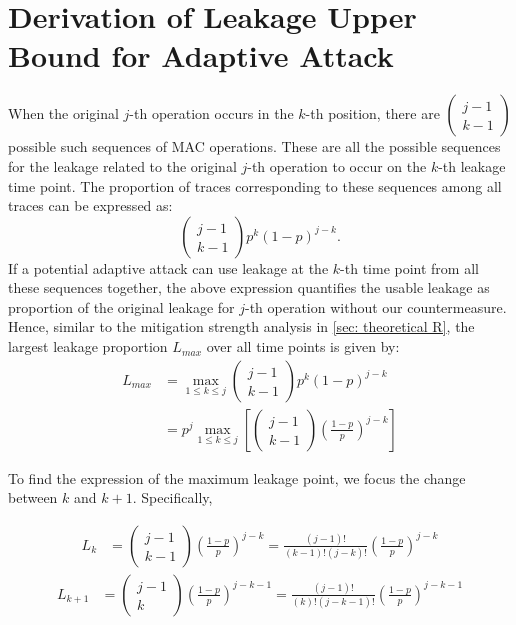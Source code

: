 \appendix
\section{Derivation of Leakage Upper Bound for Adaptive Attack} \label{appendix: leakage upperbound}
When the original $j$-th operation occurs in the $k$-th position, there are $\left(\begin{array}{c} j-1 \\ k-1 \end{array} \right)$ possible such sequences of MAC operations.
These are all the possible sequences for the leakage related to the original $j$-th operation to occur on the $k$-th leakage time point. The proportion of traces corresponding to these sequences among all traces can be expressed as:
$$
\left(\begin{array}{c} j-1 \\ k-1 \end{array} \right) p^k (1-p)^{j-k}.
$$
If a potential adaptive attack can use leakage at the $k$-th time point from all these sequences together, the above expression quantifies the usable leakage as proportion of the original leakage for $j$-th operation without our countermeasure.
Hence, similar to the mitigation strength analysis in \ref{sec: theoretical R}, the largest leakage proportion $L_{max}$ over all time points is given by:
\begin{align*}
 L_{max}  &=  \max_{1 \le k \le j} \left(\begin{array}{c} j-1 \\ k-1 \end{array} \right) p^k (1-p)^{j-k} 
\\&=   p^j \max_{1 \le k \le j}
\left[\left(\begin{array}{c} j-1 \\ k-1 \end{array} \right) \left(\frac{1-p}{p}\right)^{j-k}\right]
\end{align*}

To find the expression of the maximum leakage point, we focus the change between $k$ and $k+1$. Specifically,

{\small
\begin{align*}
    L_{k} & = \left(\begin{array}{c} j-1 \\ k-1 \end{array} \right) \left(\frac{1-p}{p}\right)^{j-k} 
 = \frac{(j-1)!}{(k-1)!(j-k)!}\left(\frac{1-p}{p}\right)^{j-k} 
\end{align*}
\begin{align*}
    L_{k+1} & = \left(\begin{array}{c} j-1 \\ k \end{array} \right) \left(\frac{1-p}{p}\right)^{j-k-1}
    = \frac{(j-1)!}{(k)!(j-k-1)!}\left(\frac{1-p}{p}\right)^{j-k-1}
\end{align*}
}

